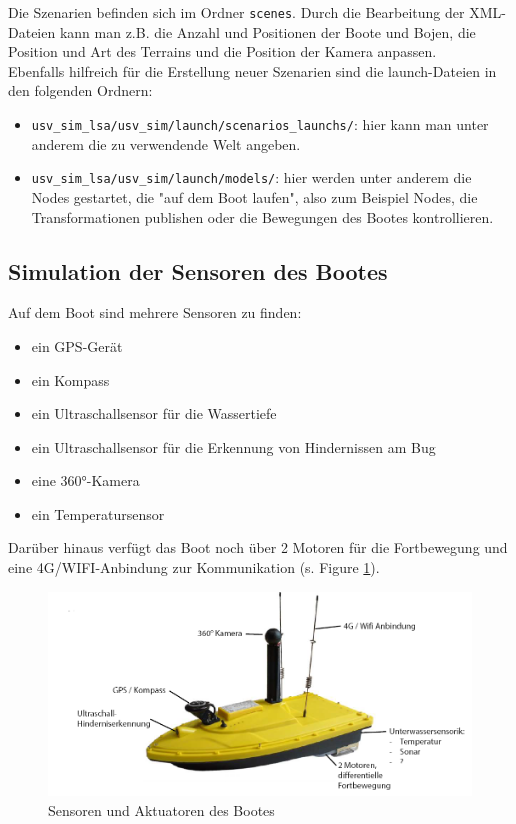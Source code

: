 \documentclass[conference]{IEEEtran}
\begin{document}
Die Szenarien befinden sich im Ordner \texttt{scenes}. Durch die Bearbeitung der XML-Dateien kann man z.B. die Anzahl und Positionen der Boote und Bojen, die Position und Art des Terrains und die Position der Kamera anpassen.\\
Ebenfalls hilfreich für die Erstellung neuer Szenarien sind die launch-Dateien in den folgenden Ordnern:

\begin{itemize}
	\item \texttt{usv\_sim\_lsa/usv\_sim/launch/scenarios\_launchs/}: hier kann man unter anderem die zu verwendende Welt angeben.
	\item \texttt{usv\_sim\_lsa/usv\_sim/launch/models/}: hier werden unter anderem die Nodes gestartet, die "auf dem Boot laufen", also zum Beispiel Nodes, die Transformationen publishen oder die Bewegungen des Bootes kontrollieren.
\end{itemize}

\subsection{Simulation der Sensoren des Bootes}

Auf dem Boot sind mehrere Sensoren zu finden:

\begin{itemize}
	\item ein GPS-Gerät
	\item ein Kompass
	\item ein Ultraschallsensor für die Wassertiefe
	\item ein Ultraschallsensor für die Erkennung von Hindernissen am Bug
	\item eine 360°-Kamera
	\item ein Temperatursensor
\end{itemize}

Darüber hinaus verfügt das Boot noch über 2 Motoren für die Fortbewegung und eine 4G/WIFI-Anbindung zur Kommunikation (s. Figure \ref{boot}).\\

\begin{figure}
	\includegraphics[width=\linewidth]{boot.png}
	\caption{Sensoren und Aktuatoren des Bootes}
	\label{boot}
\end{figure}
\end{document}
